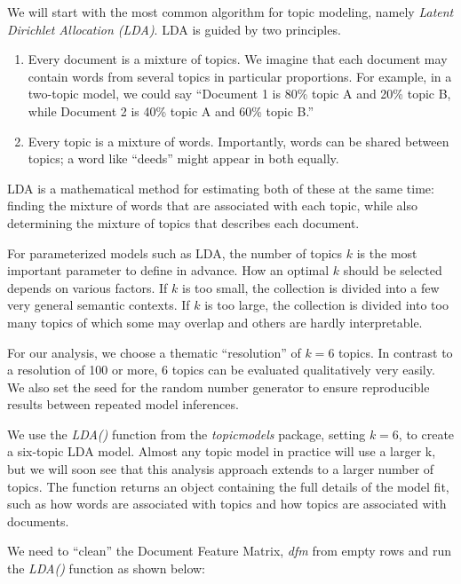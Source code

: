 \documentclass[
]{article}
\providecommand{\tightlist}{%
  \setlength{\itemsep}{0pt}\setlength{\parskip}{0pt}}
\begin{document}
We will start with the most common algorithm for topic modeling, namely \emph{Latent Dirichlet Allocation (LDA)}. LDA is guided by two principles.

\begin{enumerate}
\def\labelenumi{\arabic{enumi}.}
\tightlist
\item
  Every document is a mixture of topics. We imagine that each document may contain words from several topics in particular proportions. For example, in a two-topic model, we could say ``Document 1 is 80\% topic A and 20\% topic B, while Document 2 is 40\% topic A and 60\% topic B.''
\item
  Every topic is a mixture of words. Importantly, words can be shared between topics; a word like ``deeds'' might appear in both equally.
\end{enumerate}

LDA is a mathematical method for estimating both of these at the same time: finding the mixture of words that are associated with each topic, while also determining the mixture of topics that describes each document.

For parameterized models such as LDA, the number of topics \(k\) is the most important parameter to define in advance. How an optimal \(k\) should be selected depends on various factors. If \(k\) is too small, the collection is divided into a few very general semantic contexts. If \(k\) is too large, the collection is divided into too many topics of which some may overlap and others are hardly interpretable.

For our analysis, we choose a thematic ``resolution'' of \(k = 6\) topics. In contrast to a resolution of 100 or more, 6 topics can be evaluated qualitatively very easily. We also set the seed for the random number generator to ensure reproducible results between repeated model inferences.

We use the \emph{LDA()} function from the \emph{topicmodels} \citep{topicmodels} package, setting \(k = 6\), to create a six-topic LDA model. Almost any topic model in practice will use a larger k, but we will soon see that this analysis approach extends to a larger number of topics. The function returns an object containing the full details of the model fit, such as how words are associated with topics and how topics are associated with documents.

We need to ``clean'' the Document Feature Matrix, \emph{dfm} from empty rows and run the \emph{LDA()} function as shown below:
\end{document}
